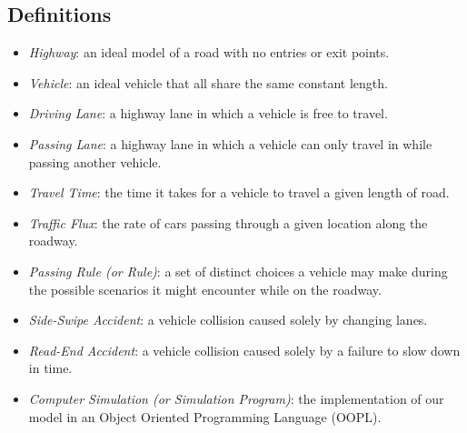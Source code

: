 \documentclass{amsart}
\begin{document}
	\subsection{Definitions}
		\begin{itemize}
  			\item \textit{Highway}: an ideal model of a road with no entries or exit points.
			\item \textit{Vehicle}: an ideal vehicle that all share the same constant length.
			\item \textit{Driving Lane}: a highway lane in which a vehicle is free to travel.
  			\item \textit{Passing Lane}: a highway lane in which a vehicle can only travel in while passing another vehicle.
			\item \textit{Travel Time}: the time it takes for a vehicle to travel a given length of road.
			\item \textit{Traffic Flux}: the rate of cars passing through a given location along the roadway.
			\item \textit{Passing Rule (or Rule)}: a set of distinct choices a vehicle may make during the possible scenarios it might encounter while on the roadway.
			\item \textit{Side-Swipe Accident}: a vehicle collision caused solely by changing lanes.
			\item \textit{Read-End Accident}: a vehicle collision caused solely by a failure to slow down in time.
			\item \textit{Computer Simulation (or Simulation Program)}: the implementation of our model in an Object Oriented Programming Language (OOPL).
			
		\end{itemize}
	
\end{document}
